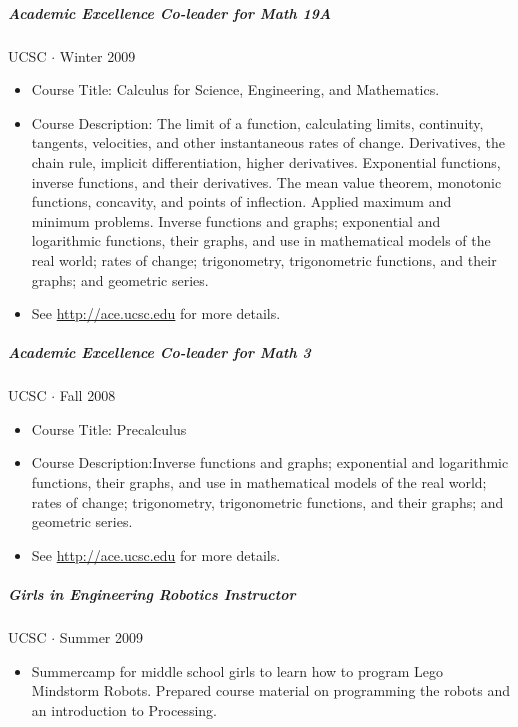 \documentclass[10pt,letterpaper]{article}
\begin{document}
\subparagraph{Academic Excellence Co-leader for Math 19A}
UCSC $\cdot$ Winter 2009
\begin{itemize}
\item Course Title: Calculus for Science, Engineering, and Mathematics. 
\item Course Description: The limit of a function, calculating limits, continuity, tangents, velocities, and other instantaneous rates of change. Derivatives, the chain rule, implicit differentiation, higher derivatives. Exponential functions, inverse functions, and their derivatives. The mean value theorem, monotonic functions, concavity, and points of inflection. Applied maximum and minimum problems. Inverse functions and graphs; exponential and logarithmic functions, their graphs, and use in mathematical models of the real world; rates of change; trigonometry, trigonometric functions, and their graphs; and geometric series. 
\item See \url{http://ace.ucsc.edu} for more details.
\end{itemize}

\subparagraph{Academic Excellence Co-leader for Math 3}
UCSC $\cdot$ Fall 2008
\begin{itemize}
\item Course Title: Precalculus
\item Course Description:Inverse functions and graphs; exponential and logarithmic functions, their graphs, and use in mathematical models of the real world; rates of change; trigonometry, trigonometric functions, and their graphs; and geometric series. 
\item See \url{http://ace.ucsc.edu} for more details.
\end{itemize}

\subparagraph{Girls in Engineering Robotics Instructor}
UCSC $\cdot$ Summer 2009
\begin{itemize}
\item Summercamp for middle school girls to learn how to program Lego Mindstorm Robots. Prepared course material on programming the robots and an introduction to Processing.
\end{itemize}
\end{document}
